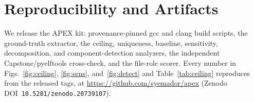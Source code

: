 \documentclass[conference]{IEEEtran}
\begin{document}
\section*{Reproducibility and Artifacts}
We release the APEX kit: provenance-pinned gcc and clang build scripts, the
ground-truth extractor, the ceiling, uniqueness, baseline, sensitivity, decomposition,
and component-detection analyzers, the independent Capstone/pyelftools cross-check, and
the file-role scorer. Every number in Figs.~\ref{fig:ceiling}, \ref{fig:sens},
and~\ref{fig:detect} and Table~\ref{tab:ceiling} reproduces from the released tags, at
\url{https://github.com/syemador/apex} (Zenodo DOI~\texttt{10.5281/zenodo.20739107}).



\end{document}
